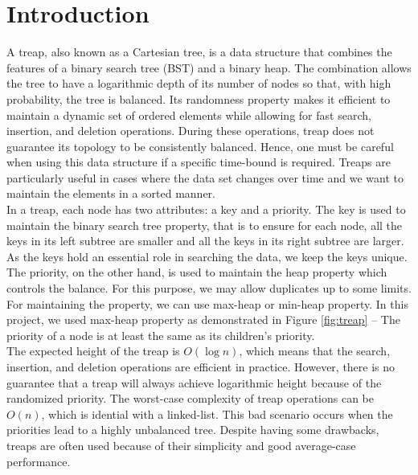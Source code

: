 \newpage
\section{Introduction}
\setcounter{subsection}{0}


\noindent A treap, also known as a Cartesian tree, is a data structure that combines the features of a binary search tree (BST) and a binary heap. The combination allows the tree to have a logarithmic depth of its number of nodes so that, with high probability, the tree is balanced. Its randomness property makes it efficient to maintain a dynamic set of ordered elements while allowing for fast search, insertion, and deletion operations. During these operations, treap does not guarantee its topology to be consistently balanced. Hence, one must be careful when using this data structure if a specific time-bound is required. Treaps are particularly useful in cases where the data set changes over time and we want to maintain the elements in a sorted manner.\\

In a treap, each node has two attributes: a key and a priority. The key is used to maintain the binary search tree property, that is to ensure for each node, all the keys in its left subtree are smaller and all the keys in its right subtree are larger. As the keys hold an essential role in searching the data, we keep the keys unique. The priority, on the other hand, is used to maintain the heap property which controls the balance. For this purpose, we may allow duplicates up to some limits. For maintaining the property, we can use max-heap or min-heap property. In this project, we used max-heap property as demonstrated in Figure \ref*{fig:treap} -- The priority of a node is at least the same as its children's priority.\\

The expected height of the treap is $O(\log n)$, which means that the search, insertion, and deletion operations are efficient in practice. However, there is no guarantee that a treap will always achieve logarithmic height because of the randomized priority. The worst-case complexity of treap operations can be $O(n)$, which is idential with a linked-list. This bad scenario occurs when the priorities lead to a highly unbalanced tree. Despite having some drawbacks, treaps are often used because of their simplicity and good average-case performance.\\


